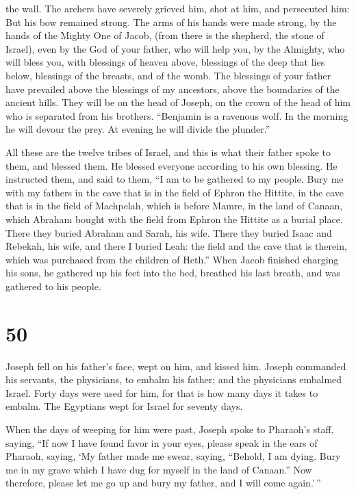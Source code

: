 the wall.  The archers have severely grieved him, shot at
him, and persecuted him:  But his bow remained strong.
The arms of his hands were made strong, by the hands of the Mighty One
of Jacob, (from there is the shepherd, the stone of Israel),
 even by the God of your father, who will help you, by
the Almighty, who will bless you, with blessings of heaven above,
blessings of the deep that lies below, blessings of the breasts, and of
the womb.  The blessings of your father have prevailed
above the blessings of my ancestors, above the boundaries of the ancient
hills. They will be on the head of Joseph, on the crown of the head of
him who is separated from his brothers.  ``Benjamin is a
ravenous wolf. In the morning he will devour the prey. At evening he
will divide the plunder.''

 All these are the twelve tribes of Israel, and this is
what their father spoke to them, and blessed them. He blessed everyone
according to his own blessing.  He instructed them, and
said to them, ``I am to be gathered to my people. Bury me with my
fathers in the cave that is in the field of Ephron the Hittite,
 in the cave that is in the field of Machpelah, which is
before Mamre, in the land of Canaan, which Abraham bought with the field
from Ephron the Hittite as a burial place.  There they
buried Abraham and Sarah, his wife. There they buried Isaac and Rebekah,
his wife, and there I buried Leah:  the field and the
cave that is therein, which was purchased from the children of Heth.''
 When Jacob finished charging his sons, he gathered up
his feet into the bed, breathed his last breath, and was gathered to his
people.

\hypertarget{section-49}{%
\section{50}\label{section-49}}

 Joseph fell on his father's face, wept on him, and kissed
him.  Joseph commanded his servants, the physicians, to
embalm his father; and the physicians embalmed Israel. 
Forty days were used for him, for that is how many days it takes to
embalm. The Egyptians wept for Israel for seventy days.

 When the days of weeping for him were past, Joseph spoke
to Pharaoh's staff, saying, ``If now I have found favor in your eyes,
please speak in the ears of Pharaoh, saying,  `My father
made me swear, saying, ``Behold, I am dying. Bury me in my grave which I
have dug for myself in the land of Canaan.'' Now therefore, please let
me go up and bury my father, and I will come again.'\,''

